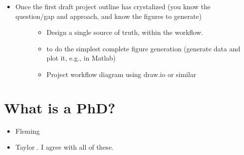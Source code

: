 \documentclass[letterpaper,10pt,english]{sphinxmanual}
\begin{document}
\begin{itemize}
\begin{description}
\begin{itemize}
\item {} 
\sphinxhyphen{}20\% of time “refactoring” (improving the code even if it’s working fine as is). An expression from software engineering is “technical debt”, the amount of disorganized clutter that slows future progress. How much time should you spend paying down technical debt (re\sphinxhyphen{}organizing your notes and directory structure, taking notes) versus producing results? This is called “refactoring”.

\end{itemize}

\end{description}

\item {} \begin{description}
\item[{Once the first draft project outline has crystalized (you know the question/gap and approach, and know the figures to generate)}] \leavevmode\begin{itemize}
\item {} 
\sphinxAtStartPar
Design a single source of truth, within the workflow.

\item {} 
\sphinxAtStartPar
{} to do the simplest complete figure generation (generate data and plot it, e.g., in Matlab)

\item {} 
\sphinxAtStartPar
Project workflow diagram using draw.io or similar

\end{itemize}

\end{description}

\end{itemize}


\chapter{What is a PhD?}
\label{\detokenize{04WhatIsAPhD:what-is-a-phd}}\label{\detokenize{04WhatIsAPhD::doc}}\begin{itemize}
\item {} 
\sphinxAtStartPar
Fleming 

\item {} 
\sphinxAtStartPar
Taylor . I agree with all of these.

\end{itemize}
\end{document}
